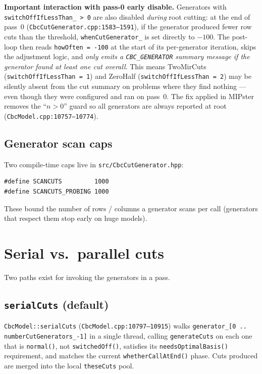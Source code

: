 \documentclass[11pt,a4paper]{article}
\begin{document}
\textbf{Important interaction with pass-0 early disable.}
Generators with \texttt{switchOffIfLessThan\_ > 0} are also disabled
\emph{during} root cutting: at the end of pass~0
(\texttt{CbcCutGenerator.cpp:1583--1591}), if the generator produced
fewer row cuts than the threshold, \texttt{whenCutGenerator\_} is set
directly to $-100$.  The post-loop then reads \texttt{howOften =
-100} at the start of its per-generator iteration, skips the
adjustment logic, and \emph{only emits a \texttt{CBC\_GENERATOR}
summary message if the generator found at least one cut overall}.
This means TwoMirCuts (\texttt{switchOffIfLessThan = 1}) and
ZeroHalf (\texttt{switchOffIfLessThan = 2}) may be silently absent
from the cut summary on problems where they find nothing --- even
though they were configured and ran on pass~0.  The fix applied in
MIPster removes the ``$n > 0$'' guard so all generators are always
reported at root (\texttt{CbcModel.cpp:10757--10774}).

\subsection*{Generator scan caps}

Two compile-time caps live in \texttt{src/CbcCutGenerator.hpp}:

\begin{lstlisting}
#define SCANCUTS         1000
#define SCANCUTS_PROBING 1000
\end{lstlisting}

These bound the number of rows / columns a generator scans per call
(generators that respect them stop early on huge models).

\section{Serial vs.\ parallel cuts}
\label{sec:parallel}

Two paths exist for invoking the generators in a pass.

\subsection*{\texttt{serialCuts} (default)}

\texttt{CbcModel::serialCuts} (\texttt{CbcModel.cpp:10797--10915})
walks \texttt{generator\_[0\,..\,numberCutGenerators\_-1]} in a
single thread, calling \texttt{generateCuts} on each one that is
\texttt{normal()}, not \texttt{switchedOff()}, satisfies its
\texttt{needsOptimalBasis()} requirement, and matches the current
\texttt{whetherCallAtEnd()} phase.  Cuts produced are merged into
the local \texttt{theseCuts} pool.
\end{document}
